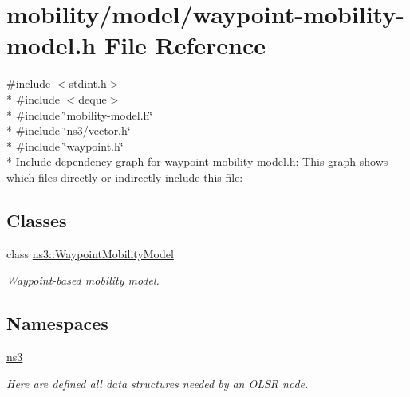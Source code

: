 \hypertarget{waypoint-mobility-model_8h}{}\section{mobility/model/waypoint-\/mobility-\/model.h File Reference}
\label{waypoint-mobility-model_8h}
{\ttfamily \#include $<$stdint.\+h$>$}\\*
{\ttfamily \#include $<$deque$>$}\\*
{\ttfamily \#include \char`\"{}mobility-\/model.\+h\char`\"{}}\\*
{\ttfamily \#include \char`\"{}ns3/vector.\+h\char`\"{}}\\*
{\ttfamily \#include \char`\"{}waypoint.\+h\char`\"{}}\\*
Include dependency graph for waypoint-\/mobility-\/model.h\+:
This graph shows which files directly or indirectly include this file\+:
\subsection*{Classes}
\begin{DoxyCompactItemize}
\item 
class \hyperlink{classns3_1_1WaypointMobilityModel}{ns3\+::\+Waypoint\+Mobility\+Model}
\begin{DoxyCompactList}\small\item\em Waypoint-\/based mobility model. \end{DoxyCompactList}\end{DoxyCompactItemize}
\subsection*{Namespaces}
\begin{DoxyCompactItemize}
\item 
 \hyperlink{namespacens3}{ns3}
\begin{DoxyCompactList}\small\item\em Here are defined all data structures needed by an O\+L\+SR node. \end{DoxyCompactList}\end{DoxyCompactItemize}
